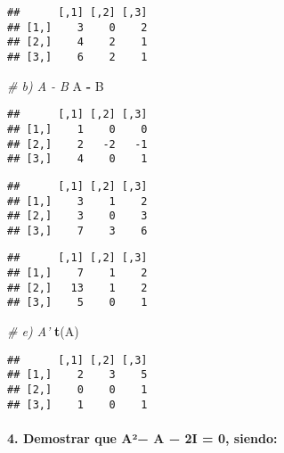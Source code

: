\documentclass[]{article}
\newenvironment{Shaded}{\begin{snugshade}}{\end{snugshade}}
\newcommand{\CommentTok}[1]{\textcolor[rgb]{0.56,0.35,0.01}{\textit{#1}}}
\newcommand{\KeywordTok}[1]{\textcolor[rgb]{0.13,0.29,0.53}{\textbf{#1}}}
\newcommand{\NormalTok}[1]{#1}
\newcommand{\OperatorTok}[1]{\textcolor[rgb]{0.81,0.36,0.00}{\textbf{#1}}}
\newcommand{\StringTok}[1]{\textcolor[rgb]{0.31,0.60,0.02}{#1}}
\let\oldparagraph\paragraph
\renewcommand{\paragraph}[1]{\oldparagraph{#1}\mbox{}}
\begin{document}
\begin{verbatim}
##      [,1] [,2] [,3]
## [1,]    3    0    2
## [2,]    4    2    1
## [3,]    6    2    1
\end{verbatim}

\begin{Shaded}
\begin{Highlighting}[]
\CommentTok{# b) A - B}
\NormalTok{A }\OperatorTok{-}\StringTok{ }\NormalTok{B}
\end{Highlighting}
\end{Shaded}

\begin{verbatim}
##      [,1] [,2] [,3]
## [1,]    1    0    0
## [2,]    2   -2   -1
## [3,]    4    0    1
\end{verbatim}

\begin{Shaded}
\end{Shaded}

\begin{verbatim}
##      [,1] [,2] [,3]
## [1,]    3    1    2
## [2,]    3    0    3
## [3,]    7    3    6
\end{verbatim}

\begin{Shaded}
\end{Shaded}

\begin{verbatim}
##      [,1] [,2] [,3]
## [1,]    7    1    2
## [2,]   13    1    2
## [3,]    5    0    1
\end{verbatim}

\begin{Shaded}
\begin{Highlighting}[]
\CommentTok{# e) A'}
\KeywordTok{t}\NormalTok{(A)}
\end{Highlighting}
\end{Shaded}

\begin{verbatim}
##      [,1] [,2] [,3]
## [1,]    2    3    5
## [2,]    0    0    1
## [3,]    1    0    1
\end{verbatim}

\hypertarget{demostrar-que-a-a-2i-0-siendo}{%
\paragraph{4. Demostrar que A²− A − 2I = 0,
siendo:}\label{demostrar-que-a-a-2i-0-siendo}}
\end{document}

